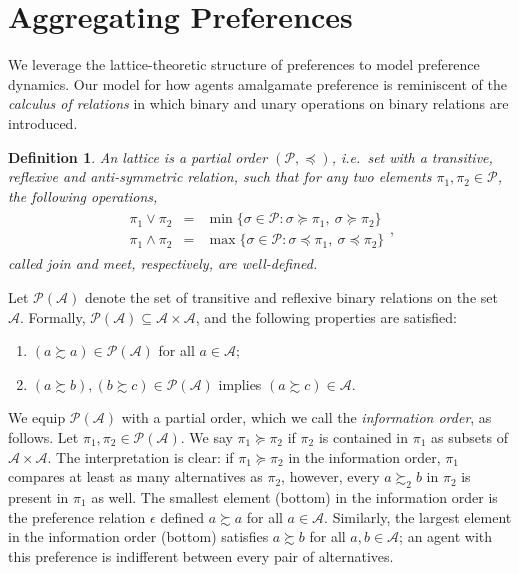 \documentclass[conference]{ieeeconf}
\newcommand{\A}{\mathcal{A}}
\renewcommand{\P}{\mathcal{P}}
\newcommand{\prefers}{\succsim}
\newcommand{\join}{\vee}
\newcommand{\meet}{\wedge}
\newtheorem{definition}{Definition}
\begin{document}
\section{Aggregating Preferences}

We leverage the lattice-theoretic \cite{birkhoff1940} structure of preferences to model preference dynamics. Our model for how agents amalgamate preference is reminiscent of the \emph{calculus of relations} \cite{tarski1941} in which binary and unary operations on binary relations are introduced. 

\begin{definition}
    An \emph{lattice} is a partial order $(\P, \preceq)$, i.e.~set with a transitive, reflexive and anti-symmetric relation, such that for any two elements $\pi_1, \pi_2 \in \P$, the following operations,
    \begin{align*}
        \begin{aligned}
        \pi_1 \join \pi_2 &=& \min\{ \sigma \in \P: \sigma \succeq \pi_1,~\sigma \succeq \pi_2 \} \\
        \pi_1 \meet \pi_2 &=& \max\{ \sigma \in \P: \sigma \preceq \pi_1,~\sigma \preceq \pi_2 \} 
        \end{aligned},
    \end{align*}
    called \emph{join} and \emph{meet}, respectively, are well-defined.
\end{definition}

Let $\P(\A)$ denote the set of transitive and reflexive binary relations on the set $\A$. Formally, $\P(\A) \subseteq \A \times \A$, and the following properties are satisfied:
\begin{enumerate}
    \item $(a \prefers a) \in \P(\A)$ for all $a \in \A$;
    \item $(a \prefers b), (b \prefers c) \in \P(\A)$ implies $(a \prefers c) \in \A$.
\end{enumerate}


We equip $\P(\A)$ with a partial order, which we call the \emph{information order}, as follows. Let $\pi_1, \pi_2 \in \P(\A)$. We say $\pi_1 \succeq \pi_2$ if $\pi_2$ is contained in $\pi_1$ as subsets of $\A \times \A$. The interpretation is clear: if $\pi_1 \succeq \pi_2$ in the information order, $\pi_1$ compares at least as many alternatives as $\pi_2$, however, every $a \prefers_2 b$ in $\pi_2$ is present in $\pi_1$ as well. The smallest element (bottom) in the information order is the preference relation $\epsilon$ defined $a \prefers a$ for all $a \in \A$. Similarly, the largest element in the information order (bottom) satisfies $a \prefers b$ for all $a,b \in \A$; an agent with this preference is indifferent between every pair of alternatives.
\end{document}
